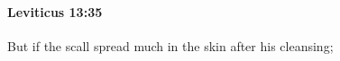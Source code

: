 
		\paragraph{Leviticus 13:35} %
			\label{LEVITICUS-13-35}

			But if the scall spread much in the skin after his cleansing;


